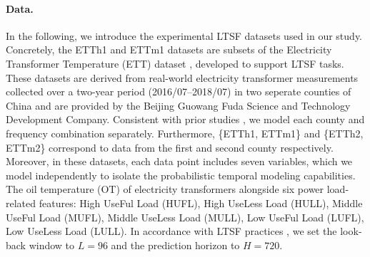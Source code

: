 \documentclass[a4paper,oneside,bibliography=totoc]{scrbook}
\begin{document}
\paragraph{Data.}
In the following, we introduce the experimental LTSF datasets used in our study. 
Concretely, the ETTh1 and ETTm1 datasets are subsets of the Electricity Transformer Temperature (ETT) dataset \cite{zhou_informer_2021}, developed to support LTSF tasks. 
These datasets are derived from real-world electricity transformer measurements collected over a two-year period (2016/07–2018/07) in two seperate counties of China and are provided by the Beijing Guowang Fuda Science and Technology Development Company.
Consistent with prior studies \cite{zhou_informer_2021, nie_time_2022}, we model each county and frequency combination separately. 
Furthermore, \{ETTh1, ETTm1\} and \{ETTh2, ETTm2\} correspond to data from the first and second county respectively. 
Moreover, in these datasets, each data point includes seven variables, which we model independently to isolate the probabilistic temporal modeling capabilities. 
The oil temperature (OT) of electricity transformers alongside six power load-related features: High UseFul Load (HUFL), High UseLess Load (HULL), Middle UseFul Load (MUFL), Middle UseLess Load (MULL), Low UseFul Load (LUFL), Low UseLess Load (LULL).
In accordance with LTSF practices \cite{zhou_informer_2021}, we set the look-back window to $L = 96$ and the prediction horizon to $H = 720$.
\end{document}
